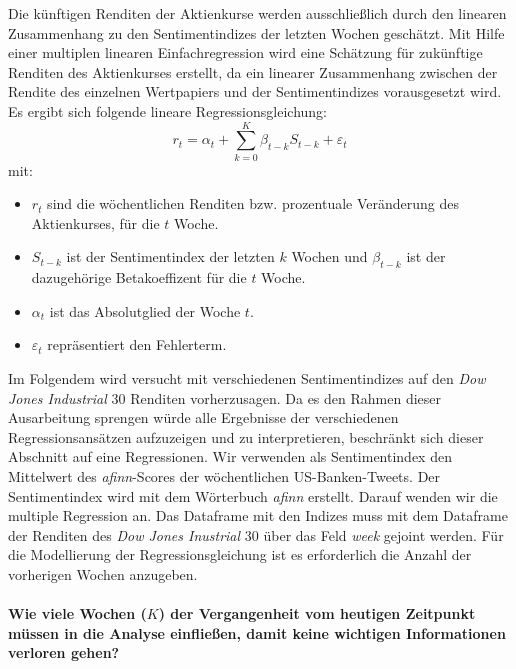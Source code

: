 Die künftigen Renditen der Aktienkurse werden ausschließlich durch den linearen Zusammenhang zu den Sentimentindizes der letzten Wochen geschätzt. Mit Hilfe einer multiplen linearen Einfachregression wird eine Schätzung für zukünftige Renditen des Aktienkurses erstellt, da ein linearer Zusammenhang zwischen der Rendite des einzelnen Wertpapiers und der Sentimentindizes vorausgesetzt wird. Es ergibt sich folgende lineare Regressionsgleichung:
\begin{equation}
r_{t}=\alpha_{t}+ \sum_{k=0}^{K} \beta_{t-k} S_{t-k}+\varepsilon_{t}
\end{equation}
mit:
\begin{itemize}
	\item  $r_{t}$ sind die wöchentlichen Renditen bzw. prozentuale Veränderung des Aktienkurses, für die $t$ Woche.
	\item $S_{t-k}$ ist der Sentimentindex der letzten $k$ Wochen und $\beta_{t-k}$ ist der dazugehörige Betakoeffizent für die $t$ Woche.
	\item $\alpha_{t}$ ist das Absolutglied der Woche $t$.
	\item $\varepsilon_{t}$ repräsentiert den Fehlerterm.
\end{itemize}
Im Folgendem wird versucht mit verschiedenen Sentimentindizes auf den \textit{Dow Jones Industrial} $30$ Renditen vorherzusagen. Da es den Rahmen dieser Ausarbeitung sprengen würde alle Ergebnisse der verschiedenen Regressionsansätzen aufzuzeigen und zu interpretieren, beschränkt sich dieser Abschnitt auf eine Regressionen. Wir verwenden als Sentimentindex den Mittelwert des \textit{afinn}-Scores der wöchentlichen US-Banken-Tweets. Der Sentimentindex wird mit dem Wörterbuch \textit{afinn} erstellt. Darauf wenden wir die multiple Regression an. Das Dataframe mit den Indizes muss mit dem Dataframe der Renditen des \textit{Dow Jones Inustrial} $30$  über das Feld \textit{week} gejoint werden. Für die Modellierung der Regressionsgleichung ist es erforderlich die Anzahl der vorherigen Wochen anzugeben.\\
\\
\textbf{Wie viele Wochen ($K$) der Vergangenheit vom heutigen Zeitpunkt müssen in die Analyse einfließen, damit keine wichtigen Informationen verloren gehen?} 
\\
\\
